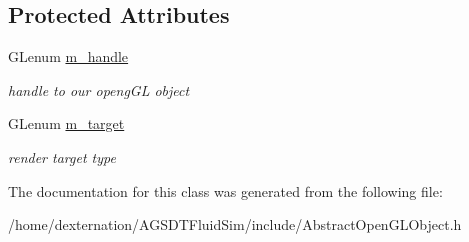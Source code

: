 \subsection*{Protected Attributes}
\begin{DoxyCompactItemize}
\item 
\hypertarget{class_abstract_open_gl_object_ac13baa5b84c78568317b014d3381fb85}{G\-Lenum \hyperlink{class_abstract_open_gl_object_ac13baa5b84c78568317b014d3381fb85}{m\-\_\-handle}}\label{class_abstract_open_gl_object_ac13baa5b84c78568317b014d3381fb85}

\begin{DoxyCompactList}\small\item\em handle to our openg\-G\-L object \end{DoxyCompactList}\item 
\hypertarget{class_abstract_open_gl_object_adb63c973aa5d7e239e903cea5b507ff2}{G\-Lenum \hyperlink{class_abstract_open_gl_object_adb63c973aa5d7e239e903cea5b507ff2}{m\-\_\-target}}\label{class_abstract_open_gl_object_adb63c973aa5d7e239e903cea5b507ff2}

\begin{DoxyCompactList}\small\item\em render target type \end{DoxyCompactList}\end{DoxyCompactItemize}


The documentation for this class was generated from the following file\-:\begin{DoxyCompactItemize}
\item 
/home/dexternation/\-A\-G\-S\-D\-T\-Fluid\-Sim/include/Abstract\-Open\-G\-L\-Object.\-h\end{DoxyCompactItemize}
